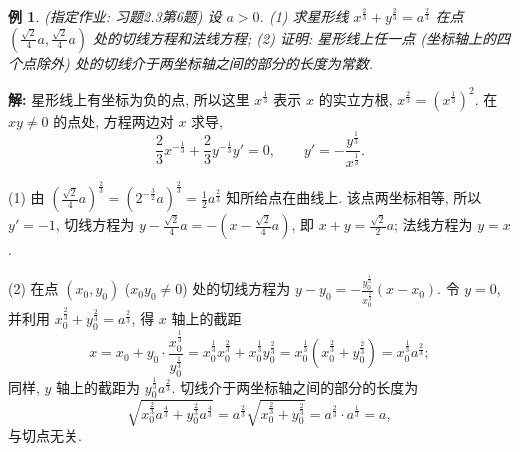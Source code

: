 \documentclass[UTF8,openany]{ctexbook}
\theoremstyle{chinesetextbook}
\newtheorem{example}{例}[section]
\newenvironment{cnsolution}{\par\indent\textbf{解:} \ignorespaces}{\par}
\begin{document}
\begin{example}\label{ex:c2-h3-6}
\textnormal{(指定作业: 习题2.3第6题)} 设 $a>0$. (1) 求星形线 $x^{\frac23}+y^{\frac23}=a^{\frac23}$ 在点 $\displaystyle\left(\frac{\sqrt2}4a,\frac{\sqrt2}4a\right)$ 处的切线方程和法线方程; (2) 证明: 星形线上任一点 (坐标轴上的四个点除外) 处的切线介于两坐标轴之间的部分的长度为常数.
\end{example}
\begin{cnsolution}
星形线上有坐标为负的点, 所以这里 $x^{\frac13}$ 表示 $x$ 的实立方根, $x^{\frac23}=\left(x^{\frac13}\right)^2$. 在 $xy\ne0$ 的点处, 方程两边对 $x$ 求导,
\[
\frac23x^{-\frac13}+\frac23y^{-\frac13}y'=0,\qquad y'=-\frac{y^{\frac13}}{x^{\frac13}}.
\]

(1) 由 $\displaystyle\left(\frac{\sqrt2}4a\right)^{\frac23}=\left(2^{-\frac32}a\right)^{\frac23}=\frac12a^{\frac23}$ 知所给点在曲线上. 该点两坐标相等, 所以 $y'=-1$, 切线方程为 $\displaystyle y-\frac{\sqrt2}4a=-\left(x-\frac{\sqrt2}4a\right)$, 即 $\displaystyle x+y=\frac{\sqrt2}2a$; 法线方程为 $y=x$.

(2) 在点 $(x_0,y_0)$ ($x_0y_0\ne0$) 处的切线方程为 $\displaystyle y-y_0=-\frac{y_0^{\frac13}}{x_0^{\frac13}}(x-x_0)$. 令 $y=0$, 并利用 $x_0^{\frac23}+y_0^{\frac23}=a^{\frac23}$, 得 $x$ 轴上的截距
\[
x=x_0+y_0\cdot\frac{x_0^{\frac13}}{y_0^{\frac13}}=x_0^{\frac13}x_0^{\frac23}+x_0^{\frac13}y_0^{\frac23}=x_0^{\frac13}\left(x_0^{\frac23}+y_0^{\frac23}\right)=x_0^{\frac13}a^{\frac23};
\]
同样, $y$ 轴上的截距为 $y_0^{\frac13}a^{\frac23}$. 切线介于两坐标轴之间的部分的长度为
\[
\sqrt{x_0^{\frac23}a^{\frac43}+y_0^{\frac23}a^{\frac43}}=a^{\frac23}\sqrt{x_0^{\frac23}+y_0^{\frac23}}=a^{\frac23}\cdot a^{\frac13}=a,
\]
与切点无关.
\end{cnsolution}
\end{document}
